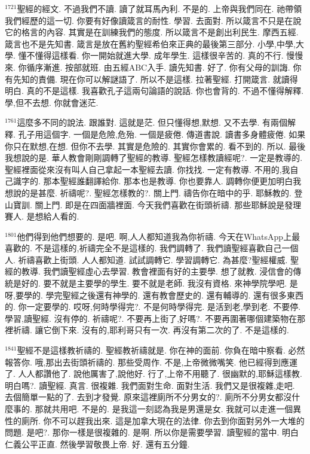 \documentclass{book}
\begin{document}
$^{1721}$聖經的經文.
不過我們不讀.
讀了就耳馬內利.
不是的.
上帝與我們同在.
祂帶領我們經歷的這一切.
你要有好像讀箴言的耐性.
學習.
去面對.
所以箴言不只是在說它的格言的內容.
其實是在訓練我們的態度.
所以箴言不是創出利民生.
摩西五經.
箴言也不是先知書.
箴言是放在舊約聖經希伯來正典的最後第三部分.
小學,中學,大學.
懂不懂得這樣看.
你一開始就進大學.
成年學生.
這樣很辛苦的.
真的不行.
慢慢來.
你循序漸進.
按部就班.
由五經ABC入手.
讀先知書.
好了.
你有父母的訓誨.
你有先知的責備.
現在你可以解謎語了.
所以不是這樣.
拉著聖經.
打開箴言.
就讀得明白.
真的不是這樣.
我喜歡孔子這兩句論語的說話.
你也會背的.
不過不懂得解釋.
學,但不去想.
你就會迷茫.

$^{1761}$這麼多不同的說法.
跟誰對.
這就是茫.
但只懂得想,默想.
又不去學.
有兩個解釋.
孔子用這個字.
一個是危險,危殆.
一個是疲倦.
傳道書說.
讀書多身體疲倦.
如果你只在默想,在想.
但你不去學.
其實是危險的.
其實你會累的.
看不到的.
所以.
最後我想說的是.
華人教會剛剛調轉了聖經的教導.
聖經怎樣教讀經呢?.
一定是教導的.
聖經裡面從來沒有叫人自己拿起一本聖經去讀.
你找找.
一定有教導.
不用的,我自己識字的.
那本聖經誰翻譯給你.
那本也是教導.
你也要靠人.
調轉你便更加明白我想說的是甚麼.
祈禱呢?.
聖經怎樣教的?.
關上門.
禱告你在暗中的乎.
耶穌教的.
登山寶訓.
關上門.
即是在四面牆裡面.
今天我們喜歡在街頭祈禱.
那些耶穌說是發理賽人.
是想給人看的.

$^{1801}$他們得到他們想要的.
是吧.
啊,人人都知道我為你祈禱.
今天在WhatsApp上最喜歡的.
不是這樣的,祈禱完全不是這樣的.
我們調轉了.
我們讀聖經喜歡自己一個人.
祈禱喜歡上街頭.
人人都知道.
試試調轉它.
學習調轉它.
為甚麼?聖經權威.
聖經的教導.
我們讀聖經虛心去學習.
教會裡面有好的主要學.
想了就教.
浸信會的傳統是好的.
要不就是主要學的學生.
要不就是老師.
我沒有資格.
來神學院學吧.
是呀,要學的.
學完聖經之後還有神學的.
還有教會歷史的.
還有輔導的.
還有很多東西的.
你一定要學的.
哎呀,何時學得完?.
不是何時學得完.
是活到老,學到老.
不要停.
學習,讀聖經.
沒有停的.
祈禱呢?.
不要再上街了,好嗎?.
不要再圍著哪個建築物在那裡祈禱.
讓它倒下來.
沒有的,耶利哥只有一次.
再沒有第二次的了.
不是這樣的.

$^{1841}$聖經不是這樣教祈禱的.
聖經教祈禱就是.
你在神的面前.
你負在暗中察看.
必然報答你.
哦,那出去街頭祈禱的.
那些受周作.
不是,上帝微微嘴笑.
他已經得到應運了.
人人都讚他了.
說他厲害了,說他好.
行了,上帝不用聽了.
很幽默的,耶穌這樣教.
明白嗎?.
讀聖經.
真言.
很複雜.
我們面對生命.
面對生活.
我們又是很複雜,走吧.
去個簡單一點的了.
去到才發覺.
原來這裡廁所不分男女的?.
廁所不分男女都沒什麼事的.
那就共用吧.
不是的.
是我這一刻認為我是男還是女.
我就可以走進一個異性的廁所.
你不可以趕我出來.
這是加拿大現在的法律.
你去到你面對另外一大堆的問題.
是吧?.
那你一樣是很複雜的.
是啊.
所以你是需要學習.
讀聖經的當中.
明白仁義公平正直.
然後學習敬畏上帝.
好.
還有五分鐘.
\end{document}
